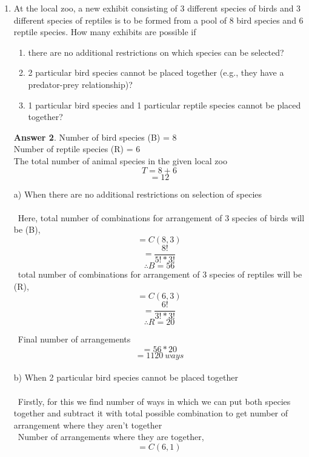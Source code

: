 \documentclass[12pt]{article}
\renewcommand{\(}{\left(}
\renewcommand{\)}{\right)}
\theoremstyle{definition}
\newtheorem*{answer}{Answer}
\begin{document}
\begin{enumerate}
\begin{shaded}
\begin{answer}
        d)
        \ This case this no different than our 2nd case, similarly we presume a married couple to represent one entity. Then we'll have \[= 5 * 4 * 3 * 2 * 1 \ ways\] of
        arranging them. Now we know that the couples themselves can be arranged in \[= 2 * 1 \ ways\] and since there are 5 couples, we'll have
        \[= 120 * 2 * 2 * 2 * 2 * 2 = 3840 \ ways\] of possible arrangements.
    \end{answer}
    \end{shaded}
    \newpage


\item At the local zoo, a new exhibit consisting of 3 different species of birds and 3 different species of reptiles is to be formed from a pool of 8 bird species and 6 reptile species. How many exhibits are possible if

\begin{enumerate}[label=\alph*.]
\item there are no additional restrictions on which species can be selected?
\item 2 particular bird species cannot be placed together (e.g., they have a predator-prey relationship)?
\item 1 particular bird species and 1 particular reptile species cannot be placed together?

\end{enumerate}

    \begin{shaded}
    \begin{answer}
        Number of bird species (B) = 8 \\
        Number of reptile species (R) = 6 \\
        The total number of animal species in the given local zoo \[ T = 8 + 6 \] \[= 12 \]
        
        a) When there are no additional restrictions on selection of species \\ \\
            \ Here, total number of combinations for arrangement of 3 species of birds will be (B),
            \[= C(8,3) \] \[= \frac{8!}{5! * 3!}\] \[\therefore B = 56\]
            \ total number of combinations for arrangement of 3 species of reptiles will be (R),
            \[= C(6,3) \] \[= \frac{6!}{3! * 3!}\] \[\therefore R = 20\]

            \ Final number of arrangements \[= 56 * 20\] \[= 1120 \ ways \] \\
        b) When 2 particular bird species cannot be placed together \\ \\ 
            \ Firstly, for this we find number of ways in which we can put both species together and subtract it with total possible 
            combination to get number of arrangement where they aren't together \\
            \ Number of arrangements where they are together, \[= C(6,1)\]
            

\end{answer}
\end{shaded}
\end{enumerate}
\end{document}
